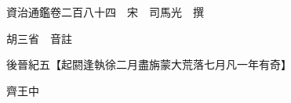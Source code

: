 










 


 
 


 

  
  
  
  
  





  
  
  
  
  
 
  

  

  
  
  



  

 
 

  
   




  

  
  


  　　資治通鑑卷二百八十四　宋　司馬光　撰

　　胡三省　音註

　　後晉紀五【起閼逢執徐二月盡旃蒙大荒落七月凡一年有奇】

　　齊王中

